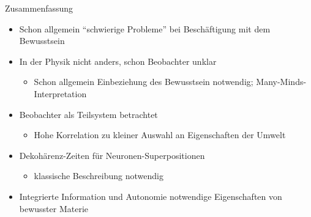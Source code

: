 \begin{frame}{Zusammenfassung}
	\begin{itemize}
		\item{Schon allgemein \enquote{schwierige Probleme} bei
			  Beschäftigung mit dem Bewusstsein}
		\item{In der Physik nicht anders, schon Beobachter unklar}
			\begin{itemize}
				\item{Schon allgemein Einbeziehung des Bewusstsein notwendig;
					  Many-Minds-Interpretation}
			\end{itemize}
		\item{Beobachter als Teilsystem betrachtet}
			\begin{itemize}
				\item{Hohe Korrelation zu kleiner Auswahl an Eigenschaften der Umwelt}
			\end{itemize}
		\item{Dekohärenz-Zeiten für Neuronen-Superpositionen}
					\begin{itemize}
						\item{klassische Beschreibung notwendig}
					\end{itemize}
		\item{Integrierte Information und Autonomie notwendige Eigenschaften von
			  bewusster Materie}
	\end{itemize}
\end{frame}